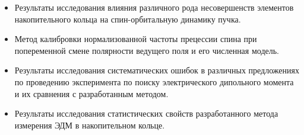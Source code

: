 \documentclass[14pt]{beamer}
\begin{document}
\begin{frame}
	\begin{itemize}
		\item Результаты исследования влияния различного рода несовершенств элементов накопительного кольца 
		на спин-орбитальную динамику пучка. 
		\item Метод калибровки нормализованной частоты прецессии спина при попеременной смене полярности ведущего поля и его численная модель.
		\item Результаты исследования систематических ошибок в различных предложениях по проведению эксперимента по поиску электрического дипольного момента и их сравнения с разработанным методом. 
		\item Результаты исследования статистических свойств разработанного метода измерения ЭДМ	в накопительном кольце.
	\end{itemize}
\end{frame}


\end{document}
